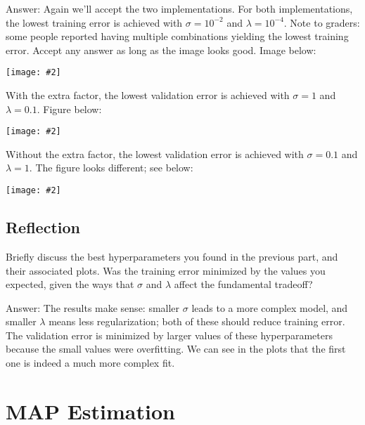 \documentclass{article}
\def\ans#1{\par\gre{Answer: #1}}
\def\answer#1{\ans{#1}}
\def\blu#1{{\color{blu}#1}}
\def\gre#1{{\color{gre}#1}}
\newcommand{\centerfig}[2]{\begin{center}\texttt{[image: \#2]}\end{center}}
\begin{document}
\answer{Again we'll accept the two implementations. For both implementations, the lowest training error is achieved with $\sigma=10^{-2}$ and $\lambda=10^{-4}$. Note to graders: some people reported having multiple combinations yielding the lowest training error. Accept any answer as long as the image looks good. Image below:\\ \centerfig{0.5}{../figs/logRegRBF_best_train.png} With the extra factor, the lowest validation error is achieved with $\sigma=1$ and $\lambda=0.1$. Figure below: \\ \centerfig{0.5}{../figs/logRegRBF_best_valid.png} Without the extra factor, the lowest validation error is achieved with $\sigma=0.1$ and $\lambda=1$. The figure looks different; see below: \centerfig{0.5}{../figs/rbf_lowest_valid_err_prefactor.png}  }

\subsection{Reflection}
\blu{
Briefly discuss the best hyperparameters you found in the previous part, and their associated plots. Was the training error minimized by the values you expected, given the ways that $\sigma$ and $\lambda$ affect the fundamental tradeoff?
\answer{The results make sense: smaller $\sigma$ leads to a more complex model, and smaller $\lambda$ means less regularization; both of these should reduce training error. The validation error is minimized by larger values of these hyperparameters because the small values were overfitting. We can see in the plots that the first one is indeed a much more complex fit.}
}
\section{MAP Estimation}
\end{document}

